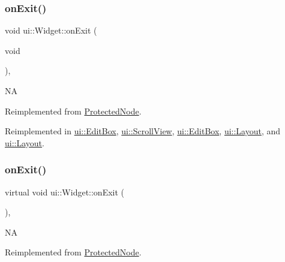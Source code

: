 \mbox{\label{classui_1_1Widget_a91cbac90873d76b6edb0e41eed5477eb}} 
\subsubsection{\texorpdfstring{on\+Exit()}{onExit()}\hspace{0.1cm}{\footnotesize\ttfamily [1/2]}}
{\footnotesize\ttfamily void ui\+::\+Widget\+::on\+Exit (\begin{DoxyParamCaption}\item[{void}]{ }\end{DoxyParamCaption})\hspace{0.3cm}{\ttfamily [override]}, {\ttfamily [virtual]}}

NA 

Reimplemented from \hyperlink{classProtectedNode_ad3eed150eb7243f2de8b2e527752a3a6}{Protected\+Node}.



Reimplemented in \hyperlink{classui_1_1EditBox_a4c5c9db7c8b7711a719aec6a0842696b}{ui\+::\+Edit\+Box}, \hyperlink{classui_1_1ScrollView_a9c9bf9f6d171a618d57c369e53d91a25}{ui\+::\+Scroll\+View}, \hyperlink{classui_1_1EditBox_a4151e7abfe84c879cc89f683c4975285}{ui\+::\+Edit\+Box}, \hyperlink{classui_1_1Layout_ad6be3b3eb4ca53dcbd3eb1ca966299ff}{ui\+::\+Layout}, and \hyperlink{classui_1_1Layout_a6444f3e3f124723e75f80b3d36408e34}{ui\+::\+Layout}.

\mbox{\label{classui_1_1Widget_a541dd9c8492eeb30a2e50b97cc94bd6e}} 
\subsubsection{\texorpdfstring{on\+Exit()}{onExit()}\hspace{0.1cm}{\footnotesize\ttfamily [2/2]}}
{\footnotesize\ttfamily virtual void ui\+::\+Widget\+::on\+Exit (\begin{DoxyParamCaption}{ }\end{DoxyParamCaption})\hspace{0.3cm}{\ttfamily [override]}, {\ttfamily [virtual]}}

NA 

Reimplemented from \hyperlink{classProtectedNode_ad3eed150eb7243f2de8b2e527752a3a6}{Protected\+Node}.



